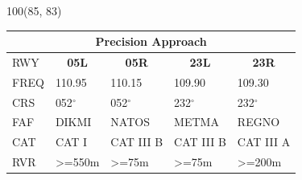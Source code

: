 \documentclass[10pt,landscape,a4paper]{article}
\begin{document}
\begin{textblock}{100}(85, 83)
\begin{table}[]
\begin{tabular}{lllll}
\multicolumn{5}{c}{\textbf{Precision Approach}} \\ \hline
\multicolumn{1}{|l|}{RWY} & \multicolumn{1}{c|}{\textbf{05L}} & \multicolumn{1}{c|}{\textbf{05R}} & \multicolumn{1}{c|}{\textbf{23L}} & \multicolumn{1}{c|}{\textbf{23R}} \\ \hline
\multicolumn{1}{|l|}{FREQ} & \multicolumn{1}{l|}{110.95} & \multicolumn{1}{l|}{110.15} & \multicolumn{1}{l|}{109.90} & \multicolumn{1}{l|}{109.30} \\
\multicolumn{1}{|l|}{CRS} & \multicolumn{1}{l|}{052$^\circ$} & \multicolumn{1}{l|}{052$^\circ$} & \multicolumn{1}{l|}{232$^\circ$} & \multicolumn{1}{l|}{232$^\circ$} \\
\multicolumn{1}{|l|}{FAF} & \multicolumn{1}{l|}{DIKMI} & \multicolumn{1}{l|}{NATOS} & \multicolumn{1}{l|}{METMA} & \multicolumn{1}{l|}{REGNO} \\
\multicolumn{1}{|l|}{CAT} & \multicolumn{1}{l|}{CAT I} & \multicolumn{1}{l|}{CAT III B} & \multicolumn{1}{l|}{CAT III B} & \multicolumn{1}{l|}{CAT III A} \\
\multicolumn{1}{|l|}{RVR} & \multicolumn{1}{l|}{\textgreater{}=550m} & \multicolumn{1}{l|}{\textgreater{}=75m} & \multicolumn{1}{l|}{\textgreater{}=75m} & \multicolumn{1}{l|}{\textgreater{}=200m} \\ \hline
\end{tabular}
\end{table}
\end{textblock}
\end{document}
